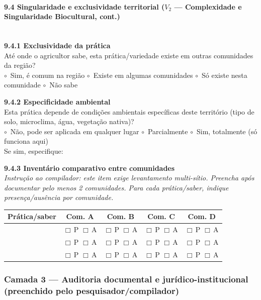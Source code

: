 \paragraph{9.4 Singularidade e exclusividade territorial ($V_2$ --- Complexidade e Singularidade Biocultural, cont.)}~\\[4pt]

\textbf{9.4.1 Exclusividade da prática}\\[2pt]
Até onde o agricultor sabe, esta prática/variedade existe em outras comunidades da região?\\
$\circ$~Sim, é comum na região \quad $\circ$~Existe em algumas comunidades \quad $\circ$~Só existe nesta comunidade \quad $\circ$~Não sabe

\medskip\noindent\textbf{9.4.2 Especificidade ambiental}\\[2pt]
Esta prática depende de condições ambientais específicas deste território (tipo de solo, microclima, água, vegetação nativa)?\\
$\circ$~Não, pode ser aplicada em qualquer lugar \quad $\circ$~Parcialmente \quad $\circ$~Sim, totalmente (só funciona aqui)\\[2pt]
Se sim, especifique: \dotfill

\medskip\noindent\textbf{9.4.3 Inventário comparativo entre comunidades}\\[2pt]
\emph{Instrução ao compilador: este item exige levantamento multi-sítio. Preencha após documentar pelo menos 2 comunidades. Para cada prática/saber, indique presença/ausência por comunidade.}

{
\begin{longtable}[]{@{}p{3.5cm}cccc@{}}
\toprule\noalign{}
Prática/saber & Com. A & Com. B & Com. C & Com. D \\
\midrule\noalign{}
\endhead
\bottomrule\noalign{}
\endlastfoot
 & $\Box$\,P $\Box$\,A & $\Box$\,P $\Box$\,A & $\Box$\,P $\Box$\,A & $\Box$\,P $\Box$\,A \\
 & $\Box$\,P $\Box$\,A & $\Box$\,P $\Box$\,A & $\Box$\,P $\Box$\,A & $\Box$\,P $\Box$\,A \\
 & $\Box$\,P $\Box$\,A & $\Box$\,P $\Box$\,A & $\Box$\,P $\Box$\,A & $\Box$\,P $\Box$\,A \\
\end{longtable}
}

\subsubsection{Camada 3 --- Auditoria documental e jurídico-institucional (preenchido pelo pesquisador/compilador)}

